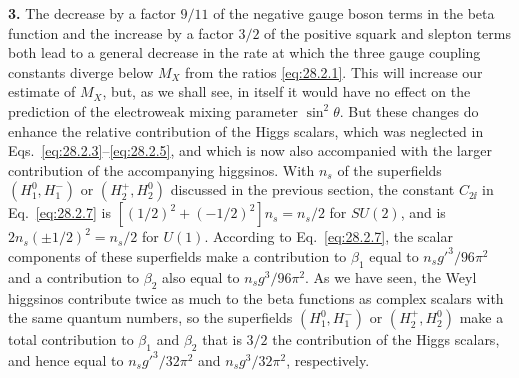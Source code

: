 \noindent\textbf{3.}\quad
The decrease by a factor \(9/11\) of the negative gauge boson terms in the
beta function and the increase by a factor \(3/2\) of the positive squark
and slepton terms both lead to a general decrease in the rate at which the
three gauge coupling constants diverge below \(M_X\) from the ratios
\eqref{eq:28.2.1}. This will increase our estimate of \(M_X\), but, as we
shall see, in itself it would have no effect on the prediction of the
electroweak mixing parameter \(\sin^2\theta\). But these changes do enhance
the relative contribution of the Higgs scalars, which was neglected in
Eqs.~\eqref{eq:28.2.3}--\eqref{eq:28.2.5}, and which is now also
accompanied with the larger contribution of the accompanying higgsinos.
With \(n_s\) of the superfields \((H_1^0,H_1^-)\) or
\((H_2^+,H_2^0)\) discussed in the previous section, the constant
\(C_{2\ii}\) in Eq.~\eqref{eq:28.2.7} is
\([(1/2)^2+(-1/2)^2]n_s=n_s/2\) for \(SU(2)\), and is
\(2n_s(\pm1/2)^2=n_s/2\) for \(U(1)\). According to
Eq.~\eqref{eq:28.2.7}, the scalar components of these superfields make a
contribution to \(\beta_1\) equal to \(n_sg'^3/96\pi^2\) and a contribution
to \(\beta_2\) also equal to \(n_sg^3/96\pi^2\). As we have seen, the
Weyl higgsinos contribute twice as much to the beta functions as
complex scalars with the same quantum numbers, so the superfields
\((H_1^0,H_1^-)\) or \((H_2^+,H_2^0)\) make a total contribution to
\(\beta_1\) and \(\beta_2\) that is \(3/2\) the contribution of the Higgs
scalars, and hence equal to \(n_sg'^3/32\pi^2\) and \(n_sg^3/32\pi^2\),
respectively.

